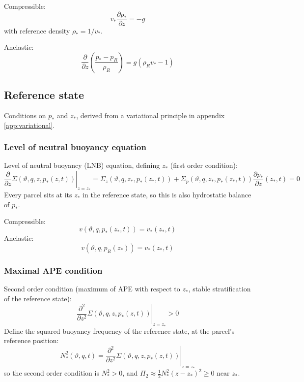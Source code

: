 \documentclass{article}
\begin{document}
Compressible:
\begin{equation}
    v_* \frac{\partial p_*}{\partial z}
    =
    - g
\end{equation}
with reference density \(\rho_* = 1 / v_*\).

Anelastic:
\begin{equation}
    \frac{\partial}{\partial z}
    \left(
        \frac{p_* - p_R}{\rho_R}
    \right)
    =
    g \left( \rho_R v_* - 1 \right)
\end{equation}

\subsection{Reference state}
Conditions on \(p_*\) and \(z_*\), derived from a variational principle in appendix \ref{app:variational}.

\subsubsection{Level of neutral buoyancy equation}
Level of neutral buoyancy (LNB) equation, defining \(z_*\) (first order condition):
\begin{equation}
    \left.
    \frac{\partial}{\partial z}
    \Sigma(\vartheta, q, z, p_*(z, t))
    \right|_{z = z_*}
    =
    \Sigma_z(\vartheta, q, z_*, p_*(z_*, t))
    + \Sigma_p(\vartheta, q, z_*, p_*(z_*, t)) \frac{\partial p_*}{\partial z}(z_*, t)
    = 0
\end{equation}
Every parcel sits at its \(z_*\) in the reference state, so this is also hydrostatic balance of \(p_*\).

Compressible:
\begin{equation}
    v(\vartheta, q, p_*(z_*, t))
    =
    v_*(z_*, t)
\end{equation}
Anelastic:
\begin{equation}
    v(\vartheta, q, p_R(z_*))
    =
    v_*(z_*, t)
\end{equation}

\subsubsection{Maximal APE condition}
Second order condition (maximum of APE with respect to \(z_*\), stable stratification of the reference state):
\begin{equation}
    \left.
    \frac{\partial^2}{\partial z^2}
    \Sigma(\vartheta, q, z, p_*(z, t))
    \right|_{z = z_*}
    > 0
\end{equation}
Define the squared buoyancy frequency of the reference state, at the parcel's reference position:
\begin{equation}
    N_*^2(\vartheta, q, t)
    =
    \left.
    \frac{\partial^2}{\partial z^2}
    \Sigma(\vartheta, q, z, p_*(z, t))
    \right|_{z = z_*}
\end{equation}
so the second order condition is \(N_*^2 > 0\), and \(\Pi_2 \approx \frac{1}{2} N_*^2 (z - z_*)^2 \geq 0\) near \(z_*\).
\end{document}
